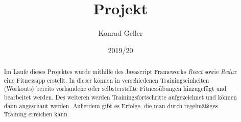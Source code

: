 \documentclass[]{report}
\title{Projekt}
\author{Konrad Geller}
\date{2019/20}
\begin{document}
\maketitle

\begin{abstract}
	Im Laufe dieses Projektes wurde mithilfe des Javascript Frameworks \textit{React} sowie \textit{Redux} eine Fitnessapp erstellt. In dieser können in verschiedenen Trainingseinheiten (Workouts) bereits vorhandene oder selbsterstellte Fitnessübungen hinzugefügt und bearbeitet werden. Des weiteren werden Trainingsfortschritte aufgezeichnet und können dann angeschaut werden. Außerdem gibt es Erfolge, die man durch regelmäßiges Training erreichen kann.
\end{abstract}
\end{document}
